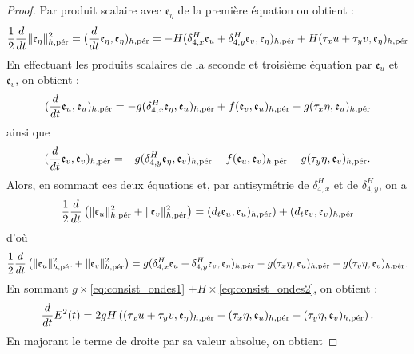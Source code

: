 \begin{proof}
Par produit scalaire avec $\mathfrak{e}_{\eta}$ de la première équation on obtient :
\begin{equation}
\dfrac{1}{2} \dfrac{d}{dt} \| \mathfrak{e}_{\eta} \|_{h,\per}^2 = (\dfrac{d}{dt} \mathfrak{e}_{\eta}, \mathfrak{e}_{\eta})_{h,\per} = - H ( \delta_{4,x}^H \mathfrak{e}_{u} + \delta_{4,y}^H \mathfrak{e}_{v}, \mathfrak{e}_{\eta})_{h,\per}  + H ( \tau_x u + \tau_y v, \mathfrak{e}_{\eta})_{h,\per}
\label{eq:consist_ondes1}
\end{equation}
En effectuant les produits scalaires de la seconde et troisième équation par $\mathfrak{e}_u$ et $\mathfrak{e}_v$, on obtient :
\begin{equation}
(\dfrac{d}{dt} \mathfrak{e}_u, \mathfrak{e}_u)_{h,\per} = - g (\delta_{4,x}^H \mathfrak{e}_{\eta}, \mathfrak{e}_u)_{h,\per} + f(\mathfrak{e}_v, \mathfrak{e}_u)_{h,\per} - g(\tau_x \eta, \mathfrak{e}_u)_{h,\per}
\end{equation}
ainsi que 
\begin{equation}
(\dfrac{d}{dt} \mathfrak{e}_v, \mathfrak{e}_v)_{h,\per} = - g (\delta_{4,y}^H \mathfrak{e}_{\eta}, \mathfrak{e}_v)_{h,\per} - f(\mathfrak{e}_u, \mathfrak{e}_v)_{h,\per} - g(\tau_y \eta, \mathfrak{e}_v)_{h,\per}.
\end{equation}
Alors, en sommant ces deux équations et, par antisymétrie de $\delta_{4,x}^H$ et de $\delta_{4,y}^H$, on a
\begin{equation}
\dfrac{1}{2} \dfrac{d}{dt} \left( \| \mathfrak{e}_{u} \|_{h,\per}^2 + \| \mathfrak{e}_{v} \|_{h,\per}^2 \right) = (d_t \mathfrak{e}_u, \mathfrak{e}_u)_{h,\per}) + (d_t \mathfrak{e}_v, \mathfrak{e}_v)_{h,\per} 
\end{equation}
d'où 
\begin{equation}
\dfrac{1}{2} \dfrac{d}{dt} \left( \| \mathfrak{e}_{u} \|_{h,\per}^2 + \| \mathfrak{e}_{v} \|_{h,\per}^2 \right) = g (\delta_{4,x}^H \mathfrak{e}_u + \delta_{4,y}^H \mathfrak{e}_v, \mathfrak{e}_{\eta})_{h,\per} - g(\tau_x \eta, \mathfrak{e}_u)_{h,\per} - g(\tau_y \eta, \mathfrak{e}_v)_{h,\per}.
\label{eq:consist_ondes2}
\end{equation}
En sommant $g \times $\eqref{eq:consist_ondes1} $+ H \times$\eqref{eq:consist_ondes2}, on obtient :
\begin{equation}
\dfrac{d}{dt} E^2(t) = 2 g H \left( (\tau_x u + \tau_y v, \mathfrak{e}_{\eta})_{h,\per} - (\tau_x \eta, \mathfrak{e}_u )_{h,\per} - (\tau_y \eta, \mathfrak{e}_v )_{h,\per} \right).
\end{equation}
En majorant le terme de droite par sa valeur absolue, on obtient

\end{proof}
